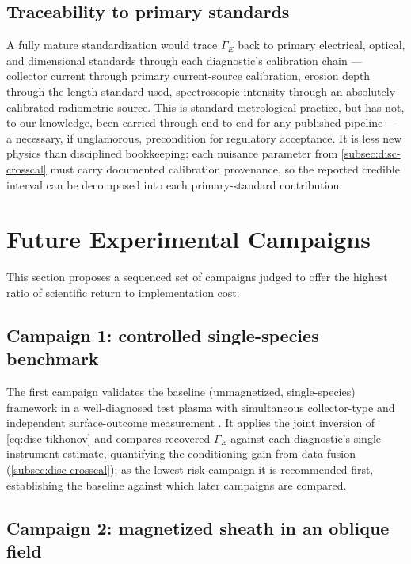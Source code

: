 \subsection{Traceability to primary standards}

A fully mature standardization would trace $\Gamma_{E}$ back to primary electrical, optical, and dimensional standards through each diagnostic's calibration chain — collector current through primary current-source calibration, erosion depth through the length standard used, spectroscopic intensity through an absolutely calibrated radiometric source. This is standard metrological practice, but has not, to our knowledge, been carried through end-to-end for any published pipeline — a necessary, if unglamorous, precondition for regulatory acceptance. It is less new physics than disciplined bookkeeping: each nuisance parameter from \cref{subsec:disc-crosscal} must carry documented calibration provenance, so the reported credible interval can be decomposed into each primary-standard contribution.

\section{Future Experimental Campaigns}
\label{sec:disc-campaigns}

This section proposes a sequenced set of campaigns judged to offer the highest ratio of scientific return to implementation cost.

\subsection{Campaign 1: controlled single-species benchmark}

The first campaign validates the baseline (unmagnetized, single-species) framework in a well-diagnosed test plasma with simultaneous collector-type and independent surface-outcome measurement \cite{ref0074,ref0075}. It applies the joint inversion of \cref{eq:disc-tikhonov} and compares recovered $\Gamma_{E}$ against each diagnostic's single-instrument estimate, quantifying the conditioning gain from data fusion (\cref{subsec:disc-crosscal}); as the lowest-risk campaign it is recommended first, establishing the baseline against which later campaigns are compared.

\subsection{Campaign 2: magnetized sheath in an oblique field}

